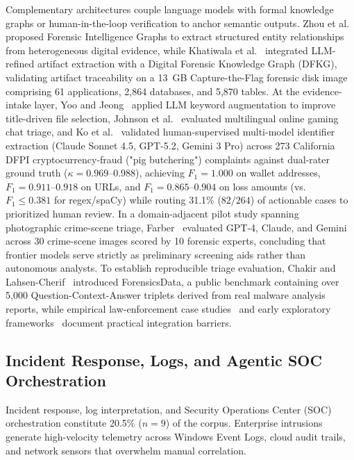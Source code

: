 Complementary architectures couple language models with formal knowledge graphs or human-in-the-loop verification to anchor semantic outputs. Zhou et al.~\cite{zhou2025_forensic} proposed Forensic Intelligence Graphs to extract structured entity relationships from heterogeneous digital evidence, while Khatiwala et al.~\cite{khatiwala2025_evaluating} integrated LLM-refined artifact extraction with a Digital Forensic Knowledge Graph (DFKG), validating artifact traceability on a 13~GB Capture-the-Flag forensic disk image comprising 61 applications, 2,864 databases, and 5,870 tables. At the evidence-intake layer, Yoo and Jeong~\cite{yoo2026_scpllmscp} applied LLM keyword augmentation to improve title-driven file selection, Johnson et al.~\cite{johnson2026_aiassisted} evaluated multilingual online gaming chat triage, and Ko et al.~\cite{ko2026_humansupervised} validated human-supervised multi-model identifier extraction (Claude Sonnet 4.5, GPT-5.2, Gemini 3 Pro) across 273 California DFPI cryptocurrency-fraud ("pig butchering") complaints against dual-rater ground truth ($\kappa=0.969\text{--}0.988$), achieving $F_1=1.000$ on wallet addresses, $F_1=0.911\text{--}0.918$ on URLs, and $F_1=0.865\text{--}0.904$ on loss amounts (vs.\ $F_1 \le 0.381$ for regex/spaCy) while routing 31.1\% ($82/264$) of actionable cases to prioritized human review. In a domain-adjacent pilot study spanning photographic crime-scene triage, Farber~\cite{farber2025_scpaiscp} evaluated GPT-4, Claude, and Gemini across 30 crime-scene images scored by 10 forensic experts, concluding that frontier models serve strictly as preliminary screening aids rather than autonomous analysts. To establish reproducible triage evaluation, Chakir and Lahsen-Cherif~\cite{chakir2025_forensicsdata} introduced ForensicsData, a public benchmark containing over 5,000 Question-Context-Answer triplets derived from real malware analysis reports, while empirical law-enforcement case studies~\cite{kim2025_digital} and early exploratory frameworks~\cite{xu2024_transforming, xu2025_enhancing, wickramasekara2025_exploring} document practical integration barriers.

\subsection{Incident Response, Logs, and Agentic SOC Orchestration}
Incident response, log interpretation, and Security Operations Center (SOC) orchestration constitute 20.5\% ($n=9$) of the corpus. Enterprise intrusions generate high-velocity telemetry across Windows Event Logs, cloud audit trails, and network sensors that overwhelm manual correlation.


